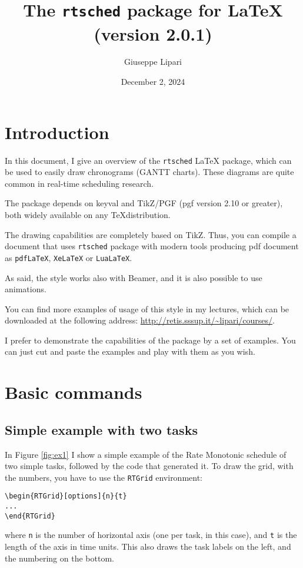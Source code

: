 \documentclass{article}
\title{The \texttt{rtsched} package for \LaTeX \\ (version 2.0.1)}
\author{Giuseppe Lipari}
\date{December 2, 2024}
\begin{document}
\maketitle

\listoffigures

\section{Introduction}

In this document, I give an overview of the \texttt{rtsched} \LaTeX
package, which can be used to easily draw chronograms (GANTT charts).
These diagrams are quite common in real-time scheduling research.

The package depends on keyval and TikZ/PGF (pgf version 2.10 or greater), both widely
available on any \TeX distribution.

The drawing capabilities are completely based on TikZ. Thus, you can compile
 a document that uses \texttt{rtsched} package with modern tools producing pdf document
as \texttt{pdfLaTeX}, \texttt{XeLaTeX} or \texttt{LuaLaTeX}.

As said, the style works also with Beamer, and it is also possible to
use animations.

You can find more examples of usage of this style in my lectures,
which can be downloaded at the following address:
\url{http://retis.sssup.it/~lipari/courses/}.

I prefer to demonstrate the capabilities of the package by a set of
examples. You can just cut and paste the examples and play with them
as you wish.

\section{Basic commands}

\subsection{Simple example with two tasks}

In Figure \ref{fig:ex1} I show a simple example of the Rate Monotonic
schedule of two simple tasks, followed by the code that generated it.
To draw the grid, with the numbers, you have to use the
\texttt{RTGrid} environment:
\begin{verbatim}
\begin{RTGrid}[options]{n}{t}
...
\end{RTGrid}
\end{verbatim}
\noindent where \texttt{n} is the number of horizontal axis (one per
task, in this case), and \texttt{t} is the length of the axis in time
units. This also draws the task labels on the left, and the numbering
on the bottom.
\end{document}
